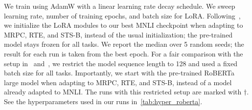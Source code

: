 \documentclass{article} %
\begin{document}
We train using AdamW with a linear learning rate decay schedule.
We sweep learning rate, number of training epochs, and batch size for LoRA.
Following~\citet{liu2019roberta}, we initialize the LoRA modules to our best MNLI checkpoint when adapting to MRPC, RTE, and STS-B, instead of the usual initialization; the pre-trained model stays frozen for all tasks.
We report the median over 5 random seeds; the result for each run is taken from the best epoch.
For a fair comparison with the setup in~\cite{houlsby_parameter-efficient_2019} and~\cite{pfeiffer2021adapterfusion}, we restrict the model sequence length to 128 and used a fixed batch size for all tasks.
Importantly, we start with the pre-trained RoBERTa large model when adapting to MRPC, RTE, and STS-B, instead of a model already adapted to MNLI.
The runs with this restricted setup are marked with $\dagger$.
See the hyperparameters used in our runs in~\autoref{tab:hyper_roberta}.
\end{document}

